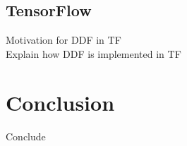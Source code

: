 \documentclass[conference,a4paper]{IEEEtran}
\begin{document}
\subsection{TensorFlow}
Motivation for DDF in TF \\
Explain how DDF is implemented in TF \\

\section{Conclusion}
Conclude \\

%



\end{document}

